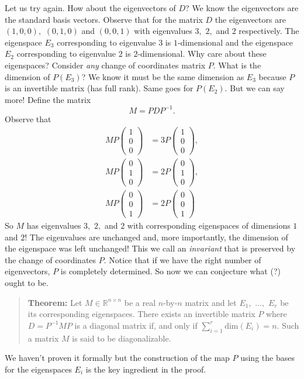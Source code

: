 Let us try again.
How about the eigenvectors of \(D\)?
We know the eigenvectors are the standard basis vectors.
Observe that for the matrix \(D\) the eigenvectors are \((1,0,0),\) \((0,1,0)\) and \((0,0,1)\) with eigenvalues \(3,\) \(2,\) and \(2\) respectively.
The eigenspace \(E_3\) corresponding to eigenvalue \(3\) is \(1\)-dimensional and the eigenspace \(E_2\) corresponding to eigenvalue \(2\) is \(2\)-dimensional.
Why care about these eigenspaces?
Consider \emph{any} change of coordinates matrix \(P.\)
What is the dimension of \(P(E_3)\)?
We know it must be the same dimension as \(E_3\) because \(P\) is an invertible matrix (has full rank).
Same goes for \(P(E_2).\)
But we can say more!
Define the matrix
\[
  M = P D P^{-1}.
\]
Observe that
\[\begin{aligned}
  M P \begin{pmatrix} 1 \\ 0 \\ 0 \end{pmatrix} &= 3 P \begin{pmatrix} 1 \\ 0 \\ 0 \end{pmatrix},\\
  M P \begin{pmatrix} 0 \\ 1 \\ 0 \end{pmatrix} &= 2 P \begin{pmatrix} 0 \\ 1 \\ 0 \end{pmatrix},\\
  M P \begin{pmatrix} 0 \\ 0 \\ 1 \end{pmatrix} &= 2 P \begin{pmatrix} 0 \\ 0 \\ 1 \end{pmatrix}
\end{aligned}\]
So \(M\) has eigenvalues \(3,\) \(2,\) and \(2\) with corresponding eigenspaces of dimensions \(1\) and \(2\)!
The eigenvalues are unchanged and, more importantly, the dimension of the eigenspace was left unchanged!
This we call an \emph{invariant} that is preserved by the change of coordinates \(P.\)
Notice that if we have the right number of eigenvectors, \(P\) is completely determined.
So now we can conjecture what (?) ought to be.
%
\begin{quote}
  \textbf{Theorem:} Let \(M \in \mathbb{R}^{n\times n}\) be a real \(n\)-by-\(n\) matrix and let \(E_1,\) \(\ldots,\) \(E_r\) be its corresponding eigenspaces.
  There exists an invertible matrix \(P\) where \(D = P^{-1} M P\) is a diagonal matrix if, and only if \(\sum_{i=1}^r \mathrm{dim}(E_i) = n.\)
  Such a matrix \(M\) is said to be diagonalizable.
\end{quote}
%
We haven't proven it formally but the construction of the map \(P\) using the bases for the eigenspaces \(E_i\) is the key ingredient in the proof.

